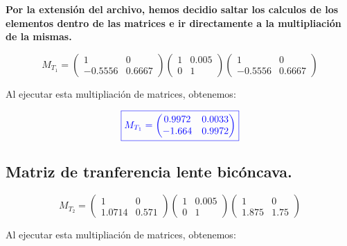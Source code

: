 \documentclass[a4paper,12pt]{article} %
\begin{document}
\begin{justify}
	\textbf{Por la extensión del archivo, hemos decidio saltar los calculos de los elementos dentro de las matrices  e ir directamente a la multipliación de la mismas.}
\end{justify}

\[ M_{T_1} =
\begin{pmatrix}
1 & 0 \\
-0.5556 & 0.6667
\end{pmatrix}
\begin{pmatrix}
1 & 0.005 \\
0 & 1
\end{pmatrix}
\begin{pmatrix}
1 & 0 \\
-0.5556 & 0.6667
\end{pmatrix}
\]

\vspace{\baselineskip}

\begin{justify}
	Al ejecutar esta multipliación de matrices, obtenemos:
\end{justify}

\[\textcolor{blue}{\boxed{ M_{T_1} =
\begin{pmatrix}
0.9972 & 0.0033 \\
-1.664 & 0.9972
\end{pmatrix}}} \]

\vspace{\baselineskip}

\subsection{Matriz de tranferencia lente bicóncava.}

\[ M_{T_2} =
\begin{pmatrix}
1 & 0 \\
1.0714& 0.571
\end{pmatrix}
\begin{pmatrix}
1 & 0.005 \\
0 & 1
\end{pmatrix}
\begin{pmatrix}
1 & 0 \\
1.875 & 1.75 
\end{pmatrix}
\]

\vspace{\baselineskip}

\begin{justify}
	Al ejecutar esta multipliación de matrices, obtenemos:
\end{justify}
\end{document}
